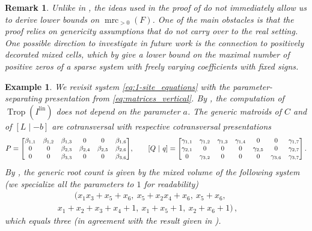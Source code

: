\documentclass[11pt,reqno,a4paper]{amsart}
\numberwithin{equation}{section}
\theoremstyle{theoremstyle}
\theoremstyle{examplestyle}
\newtheorem{example}[theorem]{Example}
\newtheorem{remark}[theorem]{Remark}
\newcommand{\lin}{{\mathrm{lin}}}
\DeclareMathOperator{\mrc}{mrc}
\DeclareMathOperator{\Trop}{Trop}
\begin{document}
\begin{remark}
Unlike in   , the ideas used in the proof of  do not immediately allow us to derive lower bounds on $\mrc_{>0}(F)$. One of the main obstacles is that the proof relies on genericity assumptions that do not carry over to the real setting. 
One possible direction to investigate in future work is the connection to \emph{positively decorated} mixed cells, which by \cite[Theorem 3.2]{BihanDickensteinGiaroli2020} give a lower bound on the maximal number of positive zeros of a sparse system with freely varying coefficients with fixed signs. 
\end{remark}


\begin{example}\label{ex:cotransversal}
We revisit  system \eqref{eq:1-site_equations} with the parameter-separating presentation from \eqref{eq:matrices_vertical}. By ,  the computation of $\Trop(I^{\lin})$ does not depend on the parameter $a$. 
The generic matroids of $C$ and of $[L \mid -b]$ are cotransversal with respective cotransversal presentations
\[
 P = {\small\begin{bmatrix}
\beta_{1,1} & \beta_{1,2} & \beta_{1,3} & 0 & 0 & \beta_{1,6} \\
0& 0 &\beta_{2,3} & \beta_{2,4} & \beta_{2,5} & \beta_{2,6} \\
0 & 0 &\beta_{3,3} & 0 & 0 &\beta_{3,6} 
\end{bmatrix}}, \qquad 
[Q\ | \ q] = 
{\small\begin{bmatrix}
\gamma_{1,1} & \gamma_{1,2} & \gamma_{1,3} & \gamma_{1,4} & 0 & 0 & \gamma_{1,7} \\
\gamma_{2,1} & 0 & 0 & 0 & \gamma_{2,5} & 0 & \gamma_{2,7} \\
0 & \gamma_{3,2} & 0 & 0&0 &  \gamma_{3,6} & \gamma_{3,7}
\end{bmatrix}}\, . 
\]
By , the generic root count is given by the mixed volume of the following system (we specialize all the parameters to $1$ for readability)
\begin{multline*}
   \qquad  (
x_1x_3 + x_5  +  x_6,\ x_5 +  x_2x_4 +    x_6 ,\  x_5 +  x_6,\\
x_1 + x_2 +  x_3 + x_4  + 1, \ 
x_1  + x_5 + 1  , \ 
 x_2 +  x_6 + 1 
)\,, \qquad 
\end{multline*}
which equals three (in agreement with the result given in ).
\end{example}
 
\end{document}
